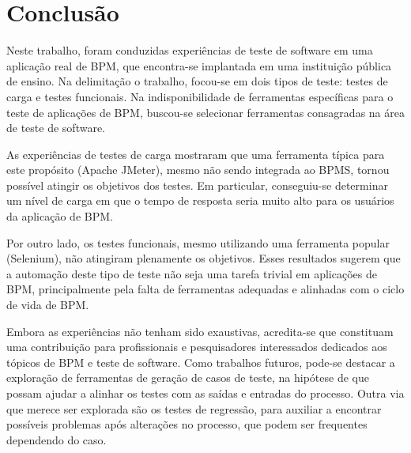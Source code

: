 \documentclass[12pt]{article}
\begin{document}

\section{Conclusão}
Neste trabalho, foram conduzidas experiências de teste de software em uma aplicação real de BPM, que encontra-se implantada em uma instituição pública de ensino. Na delimitação o trabalho, focou-se em dois tipos de teste: testes de carga e testes funcionais. Na indisponibilidade de ferramentas específicas para o teste de aplicações de BPM, buscou-se selecionar ferramentas consagradas na área de teste de software.

As experiências de testes de carga mostraram que uma ferramenta típica para este propósito (Apache JMeter), mesmo não sendo integrada ao BPMS, tornou possível atingir os objetivos dos testes. Em particular, conseguiu-se determinar um nível de carga em que o tempo de resposta seria muito alto para os usuários da aplicação de BPM.

Por outro lado, os testes funcionais, mesmo utilizando uma ferramenta popular (Selenium), não atingiram plenamente os objetivos. Esses resultados sugerem que a automação deste tipo de teste não seja uma tarefa trivial em aplicações de BPM, principalmente pela falta de ferramentas adequadas e alinhadas com o ciclo de vida de BPM.

Embora as experiências não tenham sido exaustivas, acredita-se que constituam uma contribuição para profissionais e pesquisadores interessados dedicados aos tópicos de BPM e teste de software. Como trabalhos futuros, pode-se destacar a exploração de ferramentas de geração de casos de teste, na hipótese de que possam ajudar a alinhar os testes com as saídas e entradas do processo. Outra via que merece ser explorada são os testes de regressão, para auxiliar a encontrar possíveis problemas após alterações no processo, que podem ser frequentes dependendo do caso.



\end{document}

